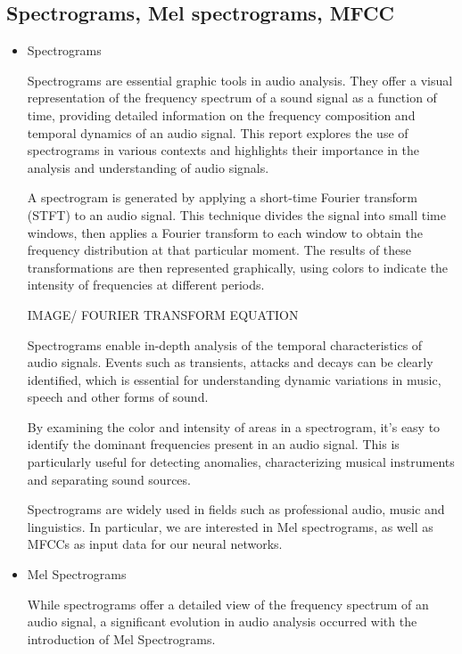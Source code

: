 \documentclass[11pt]{article}
\begin{document}
\pagebreak

\subsection{Spectrograms, Mel spectrograms, MFCC}

\begin{itemize}
    \item Spectrograms

Spectrograms are essential graphic tools in audio analysis. They offer a visual representation of the frequency spectrum of a sound signal as a function of time, providing detailed information on the frequency composition and temporal dynamics of an audio signal. This report explores the use of spectrograms in various contexts and highlights their importance in the analysis and understanding of audio signals.

A spectrogram is generated by applying a short-time Fourier transform (STFT) to an audio signal. This technique divides the signal into small time windows, then applies a Fourier transform to each window to obtain the frequency distribution at that particular moment. The results of these transformations are then represented graphically, using colors to indicate the intensity of frequencies at different periods.


IMAGE/ FOURIER TRANSFORM EQUATION


Spectrograms enable in-depth analysis of the temporal characteristics of audio signals. Events such as transients, attacks and decays can be clearly identified, which is essential for understanding dynamic variations in music, speech and other forms of sound.

By examining the color and intensity of areas in a spectrogram, it's easy to identify the dominant frequencies present in an audio signal. This is particularly useful for detecting anomalies, characterizing musical instruments and separating sound sources.

Spectrograms are widely used in fields such as professional audio, music and linguistics. In particular, we are interested in Mel spectrograms, as well as MFCCs as input data for our neural networks.

    \item Mel Spectrograms
    
While spectrograms offer a detailed view of the frequency spectrum of an audio signal, a significant evolution in audio analysis occurred with the introduction of Mel Spectrograms.


\end{itemize}
\end{document}
